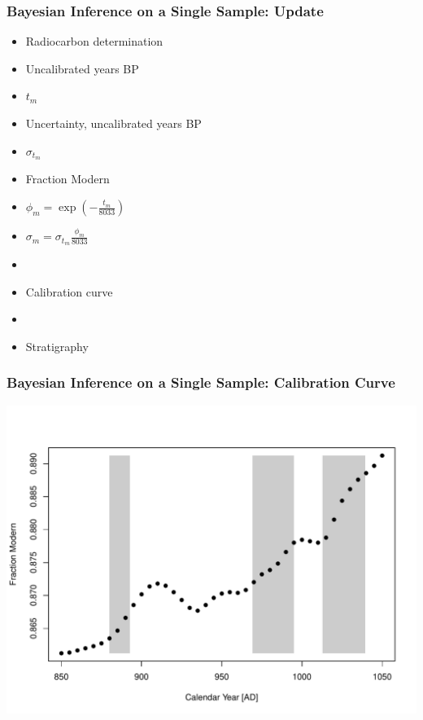 \documentclass{beamer}
\begin{document}
\begin{frame}[t]
  \frametitle{Bayesian Inference on a Single Sample: Update}
    \begin{itemize}
    \item Radiocarbon determination
    \pause
    \item Uncalibrated years BP
    \item $t_{m}$
    \pause
    \item Uncertainty, uncalibrated years BP
    \item $\sigma_{t_m}$
    \pause
    \item Fraction Modern
    \item $\phi_m = \exp(-\frac{t_m}{8033})$
    \item $\sigma_m = \sigma_{t_m} \frac{\phi_m}{8033}$
    \pause
    \item
    \item Calibration curve
    \item
    \item Stratigraphy
    \end{itemize}
\end{frame}

\begin{frame}[t]
  \frametitle{Bayesian Inference on a Single Sample: Calibration Curve}
    \includegraphics[height=.85\textheight]{single_obs_inf_plot2.pdf}
    

\end{frame}
\end{document}
